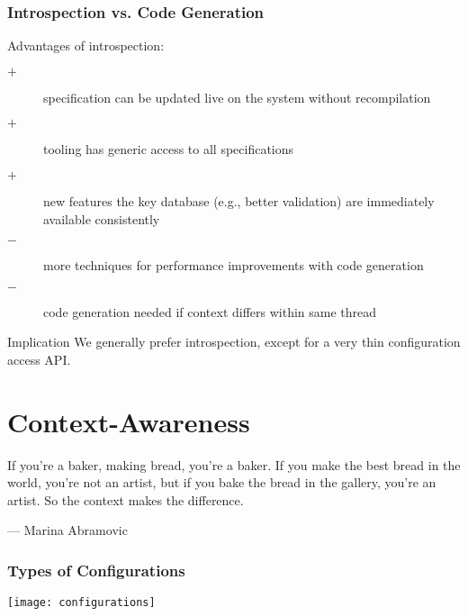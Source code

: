 \begin{frame}
	\frametitle{Introspection vs. Code Generation}
	
	Advantages of introspection:

	\begin{description}
	\item[$+$] specification can be updated live on the system without recompilation
	\item[$+$] tooling has generic access to all specifications
 	\item[$+$] new features the key database (e.g., better validation) are immediately available consistently
	\item[$-$] more techniques for performance improvements with code generation
	\item[$-$] code generation needed if context differs within same thread
	\end{description}

	\vspace{0.5em}

	\begin{alertblock}{Implication}
	We generally prefer introspection, except for a very thin configuration access API.
	\end{alertblock}
\end{frame}




\section{Context-Awareness}

\begin{frame}
	If you're a baker, making bread, you're a baker. If you make the best bread in the world, you're not an artist, but if you bake the bread in the gallery, you're an artist. So the context makes the difference.\par\raggedleft--- \textup{Marina Abramovic}
\end{frame}

\begin{frame}
	\frametitle{Types of Configurations}
	\hspace*{-1em}\texttt{[image: configurations]}
\end{frame}


